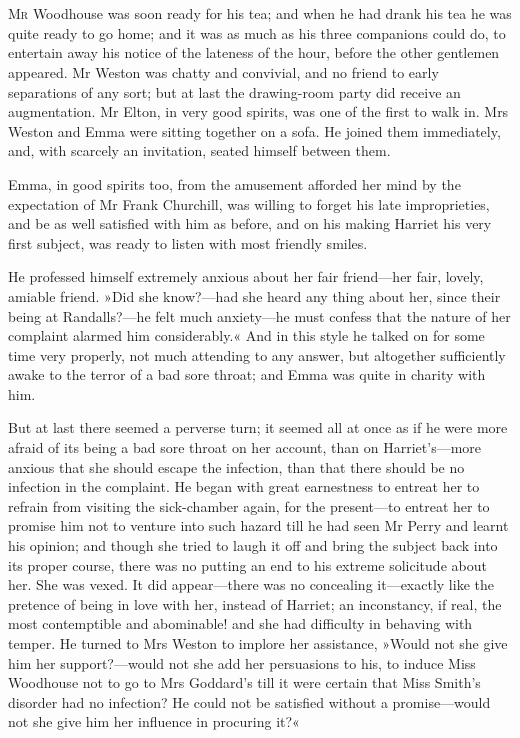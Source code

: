\chapter[Chapter \thechapter]{}
\lettrine[lines=4,lraise=0.3]{M}{r} Woodhouse was soon ready for his tea; and when he had drank his tea he was quite ready to go home; and it was as much as his three companions could do, to entertain away his notice of the lateness of the hour, before the other gentlemen appeared. Mr Weston was chatty and convivial, and no friend to early separations of any sort; but at last the drawing-room party did receive an augmentation. Mr Elton, in very good spirits, was one of the first to walk in. Mrs Weston and Emma were sitting together on a sofa. He joined them immediately, and, with scarcely an invitation, seated himself between them.

Emma, in good spirits too, from the amusement afforded her mind by the expectation of Mr Frank Churchill, was willing to forget his late improprieties, and be as well satisfied with him as before, and on his making Harriet his very first subject, was ready to listen with most friendly smiles.

He professed himself extremely anxious about her fair friend—her fair, lovely, amiable friend. »Did she know?—had she heard any thing about her, since their being at Randalls?—he felt much anxiety—he must confess that the nature of her complaint alarmed him considerably.« And in this style he talked on for some time very properly, not much attending to any answer, but altogether sufficiently awake to the terror of a bad sore throat; and Emma was quite in charity with him.

But at last there seemed a perverse turn; it seemed all at once as if he were more afraid of its being a bad sore throat on her account, than on Harriet's—more anxious that she should escape the infection, than that there should be no infection in the complaint. He began with great earnestness to entreat her to refrain from visiting the sick-chamber again, for the present—to entreat her to promise him not to venture into such hazard till he had seen Mr Perry and learnt his opinion; and though she tried to laugh it off and bring the subject back into its proper course, there was no putting an end to his extreme solicitude about her. She was vexed. It did appear—there was no concealing it—exactly like the pretence of being in love with her, instead of Harriet; an inconstancy, if real, the most contemptible and abominable! and she had difficulty in behaving with temper. He turned to Mrs Weston to implore her assistance, »Would not she give him her support?—would not she add her persuasions to his, to induce Miss Woodhouse not to go to Mrs Goddard's till it were certain that Miss Smith's disorder had no infection? He could not be satisfied without a promise—would not she give him her influence in procuring it?«

